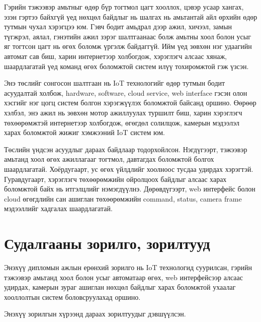\documentclass[12pt,a4paper]{report}
\begin{document}
Гэрийн тэжээвэр амьтныг өдөр бүр тогтмол цагт хооллох, цэвэр усаар хангах, эзэн гэртээ байхгүй үед нөхцөл байдлыг нь шалгах нь амьтантай айл өрхийн өдөр тутмын чухал хэрэгцээ юм. Гэвч бодит амьдрал дээр ажил, хичээл, замын түгжрэл, аялал, гэнэтийн ажил зэрэг шалтгаанаас болж амьтны хоол болон усыг яг тогтсон цагт нь өгөх боломж үргэлж байдаггүй. Ийм үед зөвхөн нэг удаагийн автомат сав биш, харин интернетээр холбогдож, хэрэглэгч алсаас хянаж, шаардлагатай үед команд өгөх боломжтой систем илүү тохиромжтой гэж үзсэн.

Энэ төслийг сонгосон шалтгаан нь IoT технологийг өдөр тутмын бодит асуудалтай холбож, hardware, software, cloud service, web interface гэсэн олон хэсгийг нэг цогц систем болгон хэрэгжүүлэх боломжтой байсанд оршино. Өөрөөр хэлбэл, энэ ажил нь зөвхөн мотор ажиллуулах туршилт биш, харин хэрэглэгч төхөөрөмжтэй интернетээр холбогдож, өгөгдөл солилцож, камерын мэдээлэл харах боломжтой жижиг хэмжээний IoT систем юм.

Төслийн үндсэн асуудлыг дараах байдлаар тодорхойлсон. Нэгдүгээрт, тэжээвэр амьтанд хоол өгөх ажиллагааг тогтмол, давтагдах боломжтой болгох шаардлагатай. Хоёрдугаарт, ус өгөх үйлдлийг хоолноос тусдаа удирдах хэрэгтэй. Гуравдугаарт, хэрэглэгч төхөөрөмжийн ойролцоох байдлыг алсаас харах боломжтой байх нь итгэлцлийг нэмэгдүүлнэ. Дөрөвдүгээрт, web интерфейс болон cloud өгөгдлийн сан ашиглан төхөөрөмжийн command, status, camera frame мэдээллийг хадгалах шаардлагатай.

\section{Судалгааны зорилго, зорилтууд}

Энэхүү дипломын ажлын ерөнхий зорилго нь IoT технологид суурилсан, гэрийн тэжээвэр амьтанд хоол болон усыг автоматаар өгөх, web интерфейсээр алсаас удирдах, камерын зураг ашиглан нөхцөл байдлыг харах боломжтой ухаалаг хооллолтын систем боловсруулахад оршино.

Энэхүү зорилгын хүрээнд дараах зорилтуудыг дэвшүүлсэн.
\end{document}
